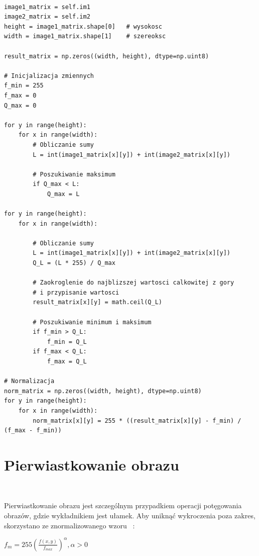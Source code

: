 \documentclass[final,a4paper,openany,12pt]{mwbk}
\begin{document}
\begin{lstlisting}[caption=Dzielenie obrazu szarego przez przez inny obraz]

image1_matrix = self.im1
image2_matrix = self.im2
height = image1_matrix.shape[0]   # wysokosc
width = image1_matrix.shape[1]    # szereoksc

result_matrix = np.zeros((width, height), dtype=np.uint8)

# Inicjalizacja zmiennych
f_min = 255
f_max = 0
Q_max = 0

for y in range(height):
    for x in range(width):  
        # Obliczanie sumy
        L = int(image1_matrix[x][y]) + int(image2_matrix[x][y])
        
        # Poszukiwanie maksimum
        if Q_max < L:
            Q_max = L

for y in range(height):
    for x in range(width):  

        # Obliczanie sumy
        L = int(image1_matrix[x][y]) + int(image2_matrix[x][y])
        Q_L = (L * 255) / Q_max

        # Zaokroglenie do najblizszej wartosci calkowitej z gory
        # i przypisanie wartosci
        result_matrix[x][y] = math.ceil(Q_L)

        # Poszukiwanie minimum i maksimum
        if f_min > Q_L:
            f_min = Q_L
        if f_max < Q_L:
            f_max = Q_L

# Normalizacja
norm_matrix = np.zeros((width, height), dtype=np.uint8)
for y in range(height):
    for x in range(width):
        norm_matrix[x][y] = 255 * ((result_matrix[x][y] - f_min) / (f_max - f_min))

\end{lstlisting}


\section {Pierwiastkowanie obrazu}
\hfill\\
\indent
		\begin{center} Pierwiastkowanie obrazu jest szczególnym przypadkiem operacji potęgowania obrazów, gdzie wykładnikiem jest ułamek. Aby uniknąć wykroczenia poza zakres, skorzystano ze znormalizowanego wzoru ~\cite{WykRat}:

		$f_{m} = 255(\frac{f(x,y)}{f_{max}}) ^{\alpha}, \alpha > 0 $
	\end{center}
	
\end{document}
